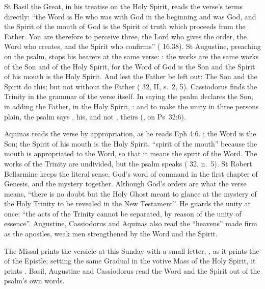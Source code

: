 St Basil the Great, in his treatise on the Holy Spirit, reads the verse's
terms directly: ``the Word is He who was with God in the beginning and was
God, and the Spirit of the mouth of God is the Spirit of truth which proceeds
from the Father. You are therefore to perceive three, the Lord who gives the
order, the Word who creates, and the Spirit who confirms'' ( 16.38). St Augustine, preaching on the psalm, stops his hearers at the
same verse: : the works are the same works of the Son and of the Holy Spirit, for the
Word of God is the Son and the Spirit of his mouth is the Holy Spirit. And
lest the Father be left out:  The Son and the Spirit do this; but not without the
Father ( 32, II, s.~2, 5). Cassiodorus finds the Trinity in the grammar of the verse itself.
In saying  the psalm declares the Son, in adding 
the Father, in  the Holy Spirit, : and
to make the unity in three persons plain, the psalm says , his,
and not , theirs (, on Ps~32:6).

Aquinas reads the verse by appropriation, as he reads Eph 4:6.
; the Word
is the Son; the Spirit of his mouth is the Holy Spirit, ``spirit of the mouth''
because the mouth is appropriated to the Word, so that it means the spirit of
the Word. The works of the Trinity are undivided, but the psalm speaks
 ( 32, n.~5). St Robert
Bellarmine keeps the literal sense, God's word of command in the first chapter
of Genesis, and the mystery together. Although God's orders are what the verse
means, ``there is no doubt but the Holy Ghost meant to glance at the mystery of
the Holy Trinity to be revealed in the New Testament''. He guards the unity at
once: ``the acts of the Trinity cannot be separated, by reason of the unity of
essence''. Augustine, Cassiodorus and Aquinas also read the ``heavens'' made
firm as the apostles, weak men strengthened by the Word and the Spirit.

The Missal prints the versicle at this Sunday with a small letter,
, as it prints the  of the Epistle; setting the
same Gradual in the votive Mass of the Holy Spirit, it prints .
Basil, Augustine and Cassiodorus read the Word and the Spirit out of the
psalm's own words.

